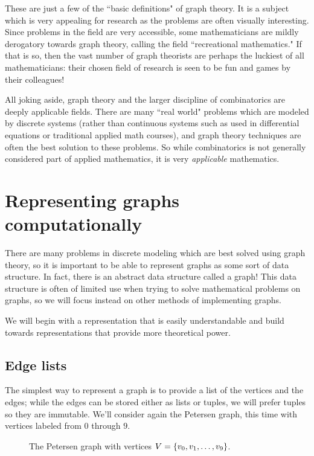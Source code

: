 \documentclass[m3380-lec-main.tex]{subfiles}
\begin{document}
These are just a few of the ``basic definitions" of graph theory. It is a subject which is very appealing for research as the problems are often visually interesting. Since problems in the field are very accessible, some mathematicians are mildly derogatory towards graph theory, calling the field ``recreational mathematics." If that is so, then the vast number of graph theorists are perhaps the luckiest of all mathematicians: their chosen field of research is seen to be fun and games by their colleagues!

All joking aside, graph theory and the larger discipline of combinatorics are deeply applicable fields. There are many ``real world" problems which are modeled by discrete systems (rather than continuous systems such as used in differential equations or traditional applied math courses), and graph theory techniques are often the best solution to these problems. So while combinatorics is not generally considered part of applied mathematics, it is very \emph{applicable} mathematics.

\section{Representing graphs computationally}
There are many problems in discrete modeling which are best solved using graph theory, so it is important to be able to represent graphs as some sort of data structure. In fact, there is an abstract data structure called a graph! This data structure is often of limited use when trying to solve mathematical problems on graphs, so we will focus instead on other methods of implementing graphs.

We will begin with a representation that is easily understandable and build towards representations that provide more theoretical power.

\subsection{Edge lists}
The simplest way to represent a graph is to provide a list of the vertices and the edges; while the edges can be stored either as lists or tuples, we will prefer tuples so they are immutable. We'll consider again the Petersen graph, this time with vertices labeled from $0$ through $9$.

\begin{figure}[hbt]
\begin{center}
\end{center}
\caption{The Petersen graph with vertices $V=\left\{v_0,v_1,\ldots,v_9\right\}$.}
\end{figure}
\end{document}
